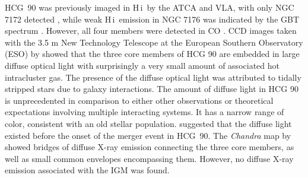 \documentclass{aa}
\newcommand{\HI}{H\,{\sc i}}
\begin{document}
HCG~90 was previously imaged in \HI\ by the ATCA and VLA, with only NGC 7172 detected \citep{1997ASPC..116..358O, 2023A&A...670A..21J}, while weak \HI\ emission in NGC 7176 was indicated by the GBT spectrum \citep{2010ApJ...710..385B}. However, all four members were detected in CO \citep{1989ApJ...342..735H, 1992A&A...257..455H, 1997ASPC..117..530V}.
CCD images taken with the 3.5 m New Technology Telescope at the 
European Southern Observatory (ESO) by \citet{2003ApJ...585..739W} showed that the three core members of HCG 90 are embedded in large diffuse optical light with surprisingly a very 
small amount of associated hot intracluster gas. The presence of the diffuse optical light was attributed to tidally stripped stars due to galaxy interactions. The amount of diffuse 
light in HCG 90 is unprecedented in comparison to either other observations or theoretical expectations involving multiple interacting systems. It has a narrow range of color, 
consistent with an old stellar population. \citet{2015MNRAS.447.3639M} suggested that the diffuse light existed before the onset of the merger event 
in HCG~90. The \textit{Chandra} map by \citet{2013ApJ...763..121D} showed bridges of diffuse X-ray emission connecting the three core members, as well as small common envelopes 
encompassing them. However, no diffuse X-ray emission associated with the IGM was found.
\end{document}
